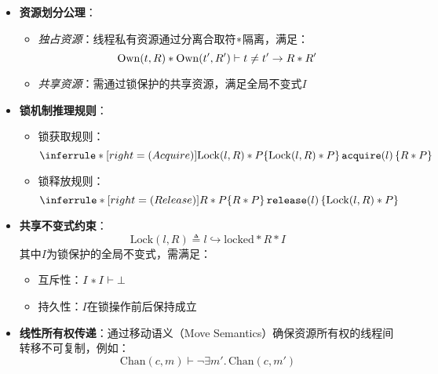 \begin{itemize}
    \item \textbf{资源划分公理}：
    \begin{itemize}
        \item \emph{独占资源}：线程私有资源通过分离合取符$\ast$隔离，满足：
            \begin{equation}
                \mathrm{Own}(t, R) \ast \mathrm{Own}(t', R') \vdash t \neq t' \rightarrow R \ast R'
            \end{equation}
        \item \emph{共享资源}：需通过锁保护的共享资源，满足全局不变式$I$
    \end{itemize}

    \item \textbf{锁机制推理规则}：
    \begin{itemize}
        \item 锁获取规则：
            \begin{equation}
            \inferrule*[right={\normalfont (Acquire)}]{
                \mathrm{Lock}(l, R) \sepcon P
            }{
                \hoare{\mathrm{Lock}(l, R) \sepcon P}{\mathtt{acquire}(l)}{R \sepcon P}
            }
            \label{eq:acquire-rule}
            \end{equation}
        
        \item 锁释放规则：
            \begin{equation}
            \inferrule*[right={\normalfont (Release)}]{
                R \sepcon P
            }{
                \hoare{R \sepcon P}{\mathtt{release}(l)}{\mathrm{Lock}(l, R) \sepcon P}
            }
            \label{eq:release-rule}
            \end{equation}
    \end{itemize}

    \item \textbf{共享不变式约束}：
        \begin{equation}
            \mathrm{Lock}(l, R) \triangleq l \hookrightarrow \mathrm{locked} \ast R \ast I
            \label{eq:lock-inv}
        \end{equation}
        其中$I$为锁保护的全局不变式，需满足：
        \begin{itemize}
            \item 互斥性：$I \ast I \vdash \bot$
            \item 持久性：$I$在锁操作前后保持成立
        \end{itemize}

    \item \textbf{线性所有权传递}：通过移动语义（Move Semantics）确保资源所有权的线程间转移不可复制，例如：
        \begin{equation}
            \mathrm{Chan}(c, m) \vdash \neg \exists m'.\, \mathrm{Chan}(c, m') 
        \end{equation}
\end{itemize}


